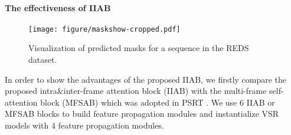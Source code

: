 \documentclass[10pt,twocolumn,letterpaper]{article}
\begin{document}
\paragraph{The effectiveness of IIAB}
\begin{table}
	\centering
 \caption{Ablation studies on the processing blocks and the proposed adaptive mask prediction module. More details can be found in our ablation study section.} 
	\label{tab:threshold_ablation}
    \begin{threeparttable}
    \begin{adjustbox}{center}  
    \centering
  \end{adjustbox}
  \end{threeparttable}
\end{table}
\begin{figure}
\hspace{-0.62cm}
\texttt{[image: figure/maskshow-cropped.pdf]}
\caption{Visualization of predicted masks for a sequence in the REDS dataset.}
\label{fig:IIABwithmask}
\end{figure}
In order to show the advantages of the proposed IIAB, we firstly compare the proposed intra\&inter-frame attention block (IIAB) with the multi-frame 
self-attention block (MFSAB) which was adopted in PSRT \cite{shi2022rethinking}.
%
We use 6 IIAB or MFSAB blocks to build feature propagation modules and instantialize VSR models with 4 feature propagation modules.
\end{document}
